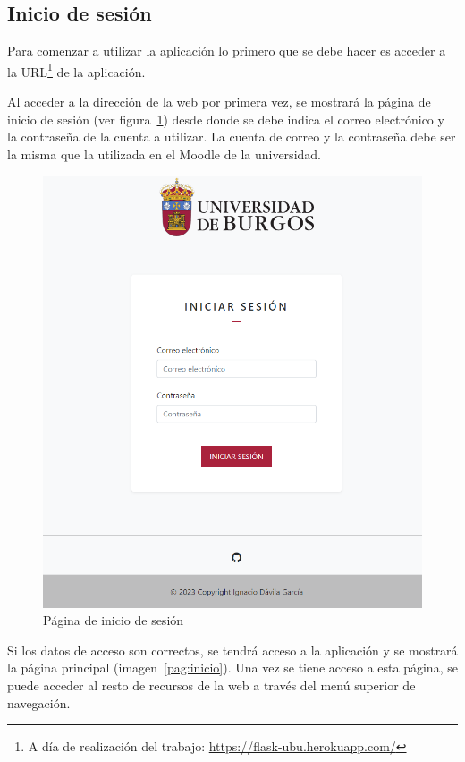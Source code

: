 \subsection{Inicio de sesión}

Para comenzar a utilizar la aplicación lo primero que se debe hacer es acceder a la URL\footnote{A día de realización del trabajo: \url{https://flask-ubu.herokuapp.com/}} de la aplicación.

Al acceder a la dirección de la web por primera vez, se mostrará la página de inicio de sesión (ver figura~\ref{pag:login}) desde donde se debe indica el correo electrónico y la contraseña de la cuenta a utilizar.
La cuenta de correo y la contraseña debe ser la misma que la utilizada en el Moodle de la universidad.

\begin{figure}
	\centering
	\includegraphics[width=\textwidth]{../img/Anexos/Manual usuario/login.png}
	\caption{Página de inicio de sesión}\label{pag:login}
\end{figure}

Si los datos de acceso son correctos, se tendrá acceso a la aplicación y se mostrará la página principal (imagen~\ref{pag:inicio}).
Una vez se tiene acceso a esta página, se puede acceder al resto de recursos de la web a través del menú superior de navegación.


